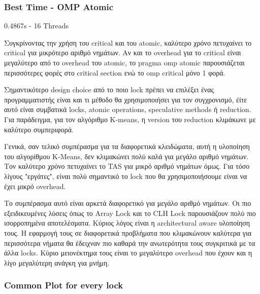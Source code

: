 \documentclass[../final_report.tex]{subfiles}
\begin{document}
\subsubsection*{Best Time - OMP Atomic}
0.4867s - 16 Threads

Συγκρίνοντας την χρήση του critical και του atomic, καλύτερο χρόνο πετυχαίνει το critical για μικρότερο αριθμό
νημάτων. Αν και το overhead για το critical είναι μεγαλύτερο από το overhead του atomic, το pragma omp atomic 
παρουσιάζεται περισσότερες φορές στο critical section ενώ το omp critical μόνο 1 φορά. 

Σημαντικότερο design choice από το ποιο lock πρέπει να επιλέξει ένας προγραμματιστής είναι και τι μέθοδο θα χρησιμοποιήσει
για τον συγχρονισμό, έίτε αυτό είναι συμβατικά locks, atomic operations, speculative methods ή reduction.
Για παράδειγμα, για τον αλγόριθμο K-means, η version του reduction κλιμάκωνε με καλύτερο συμπεριφορά.

Γενικά, σαν τελικό συμπέρασμα για τα διαφορετικά κλειδώματα, αυτή η υλοποίηση του αλγορίθμου K-Means, 
δεν κλιμακώνει πολύ καλά για μεγάλο αριθμό νημάτων. Τον καλύτερο χρόνο πετυχαίνει το TAS για μικρό αριθμό
νημάτων όμως. Για τόσο λίγους "εργάτες", είναι πολύ σημαντικό το lock που θα χρησιμοποιήσουμε είναι να έχει μικρό
overhead. 

Το συμπέρασμα αυτό είναι αρκετά διαφορετικό για μεγάλο αριθμό νημάτων. Οι πιο εξειδικευμένες λύσεις όπως το 
Array Lock και το CLH Lock παρουσιάζουν πολύ πιο ισορροπημένα αποτελέσματα. Κύριος λόγος είναι η architectural aware
υλοποίηση τους. Η εφαρμογή τους σε διαφορετικά προβλήματα που κλιμακώνουν καλύτερα για περισσότερα νήματα θα έδειχναν
πιο καθαρά την ανωτερότητα τους συγκριτικά με τα άλλα locks. Κύριο μειονέκτημα τους είναι το μεγαλύτερο overhead που έχουν και η 
λίγο μεγαλύτερη ανάγκη για μνήμη.

\subsubsection*{Common Plot for every lock}
\end{document}
